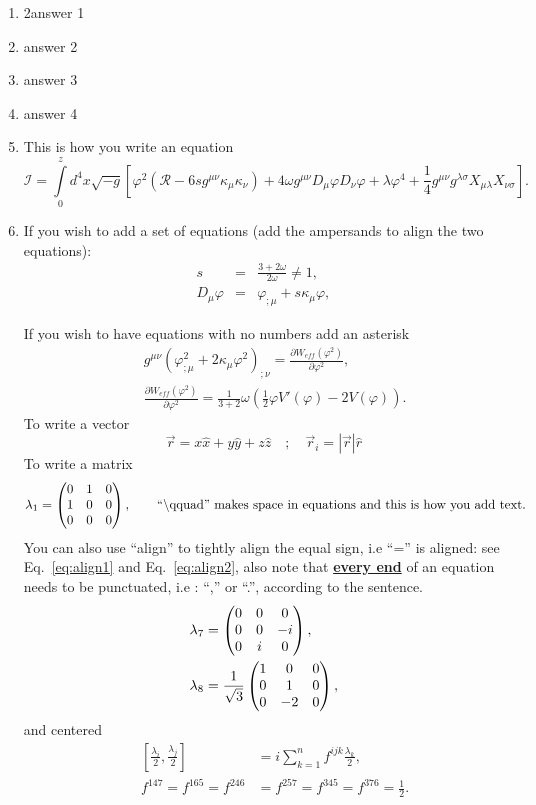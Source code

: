 \documentclass[11pt,fleqn]{article}
\newcommand{\amatrix}[1]{\begin{matrix} #1 \end{matrix}}
\newcommand{\Dn}{\vspace*{3mm}}
\begin{document}
\Dn
\begin{enumerate}
\item  2answer 1
\item answer 2
\item answer 3
\item answer 4
\item This is how you write an equation
\begin{equation}
\mathcal{I} =\int \limits_0^z  d^4x \sqrt{-g}\left[\varphi^2\left(\mathcal{R}-6sg^{\mu \nu} \kappa_\mu \kappa_\nu\right) + 4 \omega g^{\mu \nu}D_\mu \varphi D_\nu \varphi + \lambda \varphi^4 + \frac{1}{4}g^{\mu \nu} g^{\lambda \sigma}X_{\mu \lambda}X_{\nu \sigma}\right].
\end{equation}

\item If you wish to add a set of equations (add the ampersands to align the two equations):
\begin{eqnarray}
 s &=& \frac{3+2\omega}{2\omega}\neq 1,\\
 D_\mu \varphi &=& \varphi_{;\mu} + s \kappa_\mu \varphi,
\end{eqnarray}

If you wish to have equations with no numbers add an asterisk
\begin{eqnarray*}
&& g^{\mu \nu} \left( \varphi^2_{;\mu} + 2 \kappa_\mu \varphi^2\right)_{;\nu} = \frac{\partial W_{eff}(\varphi^2)}{\partial \varphi^2}, \\
&& \frac{\partial W_{eff}(\varphi^2)}{\partial \varphi^2} = \frac{1}{3+ 2} \omega \left(\frac{1}{2} \varphi V'(\varphi) - 2V(\varphi)\right).
\end{eqnarray*}
To write a vector
\begin{equation}
\vec{r} = x \hat{x} + y \hat{y} + z\hat{z} \quad ; \quad \vec{r}_i
= \left|\vec{r}\right|\hat{r} \end{equation}
To write a matrix
\begin{equation}
\lambda_1 
= \left( \amatrix { 0 & 1 & 0 \cr 1 & 0 & 0 \cr 0 & 0 & 0}\right), \text{\qquad ``\textbackslash qquad'' makes space in equations and this is how you add text.}
\end{equation}
You can also use ``align'' to tightly align the equal sign, i.e ``='' is aligned: see Eq.~\eqref{eq:align1} and Eq.~\eqref{eq:align2},  also note that {\underline{\bf every end}} of an  equation needs to be punctuated, i.e : ``,'' or ``.'', according to the sentence. 
\begin{align}
\lambda_7 
&= \left( \amatrix { 0 & 0 & 0 \cr 0 & 0 & -i \cr 0 & i & 0}\right), \label{eq:align1}\\
 \lambda_8 
&= \frac{1}{\sqrt{3}}\left( \amatrix { 1 & 0 & 0 \cr 0 & 1 & 0 \cr 0 & -2 & 0}\right),\label{eq:align2}
\end{align}
and centered
\begin{align*}
&&\left[\frac{\lambda_i}{2},\frac{\lambda_j}{2}\right] &= i \displaystyle\sum_{k=1}^{n} f^{ijk}\frac{\lambda_k}{2}, \\
&&f^{147}=f^{165}=f^{246}&=f^{257}=f^{345}=f^{376}= \frac{1}{2}.
\end{align*}


\end{enumerate}
\end{document}
